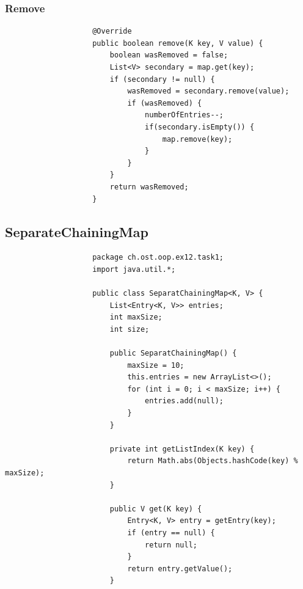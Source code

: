 \documentclass[a4paper, landscape, 8pt]{scrartcl}
\begin{document}
\begin{multicols*}{4}
                \subsubsection{Remove}
                    \begin{lstlisting}
                    @Override
                    public boolean remove(K key, V value) {
                        boolean wasRemoved = false;
                        List<V> secondary = map.get(key);
                        if (secondary != null) {
                            wasRemoved = secondary.remove(value);
                            if (wasRemoved) {
                                numberOfEntries--;
                                if(secondary.isEmpty()) {
                                    map.remove(key);
                                }
                            }
                        }
                        return wasRemoved;
                    }
                    \end{lstlisting}

            \subsection{SeparateChainingMap}
                \begin{lstlisting}
                    package ch.ost.oop.ex12.task1;
                    import java.util.*;

                    public class SeparatChainingMap<K, V> {
                        List<Entry<K, V>> entries;
                        int maxSize;
                        int size;

                        public SeparatChainingMap() {
                            maxSize = 10;
                            this.entries = new ArrayList<>();
                            for (int i = 0; i < maxSize; i++) {
                                entries.add(null);
                            }
                        }

                        private int getListIndex(K key) {
                            return Math.abs(Objects.hashCode(key) % maxSize);
                        }

                        public V get(K key) {
                            Entry<K, V> entry = getEntry(key);
                            if (entry == null) {
                                return null;
                            }
                            return entry.getValue();
                        }


\end{lstlisting}
\end{multicols*}
\end{document}
